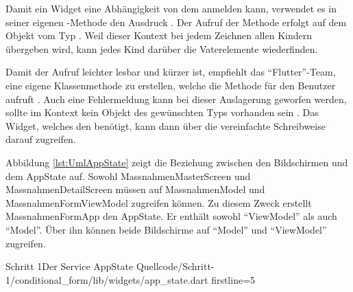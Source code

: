Damit ein Widget eine Abhängigkeit von dem  anmelden kann, verwendet es in seiner eigenen -Methode den Ausdruck .
Der Aufruf der Methode erfolgt auf dem Objekt vom Typ .
Weil dieser Kontext bei jedem Zeichnen allen Kindern übergeben wird, kann jedes Kind darüber die Vaterelemente wiederfinden.

Damit der Aufruf leichter lesbar und kürzer ist, empfiehlt das \enquote{Flutter}-Team, eine eigene Klassenmethode zu erstellen, welche die Methode für den Benutzer aufruft .
Auch eine Fehlermeldung kann bei dieser Auslagerung geworfen werden, sollte im Kontext kein Objekt des gewünschten Typs vorhanden sein .
Das Widget, welches den  benötigt, kann dann über die vereinfachte Schreibweise  darauf zugreifen.

Abbildung \ref{lst:UmlAppState} zeigt die Beziehung zwischen den Bildschirmen und dem AppState auf.
Sowohl MassnahmenMasterScreen und MassnahmenDetailScreen müssen auf MassnahmenModel und MassnahmenFormViewModel zugreifen können.
Zu diesem Zweck erstellt MassnahmenFormApp den AppState.
Er enthält sowohl \enquote{ViewModel} als auch \enquote{Model}.
Über ihn können beide Bildschirme auf \enquote{Model} und \enquote{ViewModel} zugreifen.



\begin{alexlisting}{Schritt 1}{Der Service AppState}
  {Quellcode/Schritt-1/conditional_form/lib/widgets/app_state.dart}
  {firstline=5}
  \label{lst:Schritt1DerServiceAppState}
\end{alexlisting}


